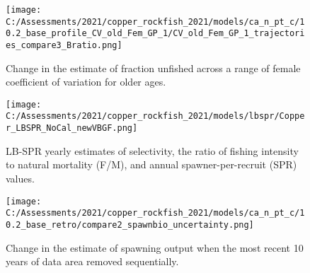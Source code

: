 \documentclass[11pt,
  english,
  a4paper,
]{article}
\begin{document}
\tagmcend\tagstructend


\begin{figure}
\centering
\texttt{[image: C:/Assessments/2021/copper\_rockfish\_2021/models/ca\_n\_pt\_c/10.2\_base\_profile\_CV\_old\_Fem\_GP\_1/CV\_old\_Fem\_GP\_1\_trajectories\_compare3\_Bratio.png]}
\caption{Change in the estimate of fraction unfished across a range of female coefficient of variation for older ages.\label{fig:cv-depl}}
\end{figure}

\tagmcend\tagstructend

\newpage


\begin{figure}
\centering
\texttt{[image: C:/Assessments/2021/copper\_rockfish\_2021/models/lbspr/Copper\_LBSPR\_NoCal\_newVBGF.png]}
\caption{LB-SPR yearly estimates of selectivity, the ratio of fishing intensity to natural mortality (F/M), and annual spawner-per-recruit (SPR) values.\label{fig:lbspr}}
\end{figure}

\tagmcend\tagstructend

\newpage


\begin{figure}
\centering
\texttt{[image: C:/Assessments/2021/copper\_rockfish\_2021/models/ca\_n\_pt\_c/10.2\_base\_retro/compare2\_spawnbio\_uncertainty.png]}
\caption{Change in the estimate of spawning output when the most recent 10 years of data area removed sequentially.\label{fig:retro-ssb}}
\end{figure}

\tagmcend\tagstructend

\end{document}
